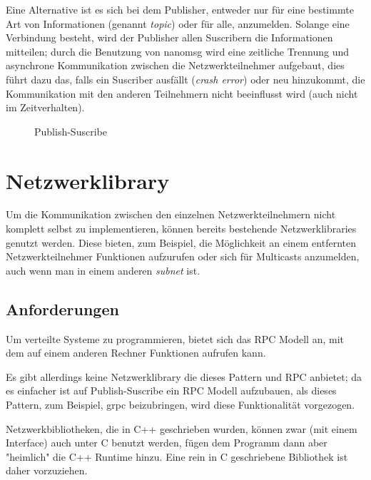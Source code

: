Eine Alternative ist es sich bei dem Publisher, entweder nur f{\"{u}}r eine bestimmte Art von Informationen (genannt \textit{topic}) oder f{\"{u}}r alle, anzumelden. Solange eine Verbindung besteht,
wird der Publisher allen Suscribern die Informationen mitteilen; durch die Benutzung von nanomsg wird eine zeitliche Trennung und asynchrone Kommunikation zwischen die Netzwerkteilnehmer aufgebaut,
dies f{\"{u}}hrt dazu das, falls ein Suscriber ausf{\"{a}}llt (\textit{crash error}) oder neu hinzukommt, die Kommunikation mit den anderen Teilnehmern nicht beeinflusst wird (auch nicht im Zeitverhalten).
\begin{figure}
	\centering
	\caption{Publish-Suscribe}
	\label{fig:pubsub}
\end{figure}


\clearpage
\section{Netzwerklibrary}
Um die Kommunikation zwischen den einzelnen Netzwerkteilnehmern nicht komplett selbst zu implementieren, k{\"{o}}nnen bereits bestehende Netzwerklibraries genutzt werden.
Diese bieten, zum Beispiel, die M{\"{o}}glichkeit an einem entfernten Netzwerkteilnehmer Funktionen aufzurufen oder sich f{\"{u}}r Multicasts anzumelden, auch wenn man in einem anderen
\textit{subnet} ist.

\subsection{Anforderungen}
Um verteilte Systeme zu programmieren, bietet sich das RPC Modell an, mit dem auf einem anderen Rechner Funktionen aufrufen kann.

Es gibt allerdings keine Netzwerklibrary die dieses Pattern und RPC anbietet; da es einfacher ist auf Publish-Suscribe ein RPC Modell aufzubauen, als dieses Pattern, zum Beispiel, grpc beizubringen, wird
diese Funktionalit{\"{a}}t vorgezogen.

Netzwerkbibliotheken, die in C++ geschrieben wurden, k{\"{o}}nnen zwar (mit einem Interface) auch unter C benutzt werden, f{\"{u}}gen dem Programm
dann aber "heimlich" die C++ Runtime hinzu. Eine rein in C geschriebene Bibliothek ist daher vorzuziehen.

